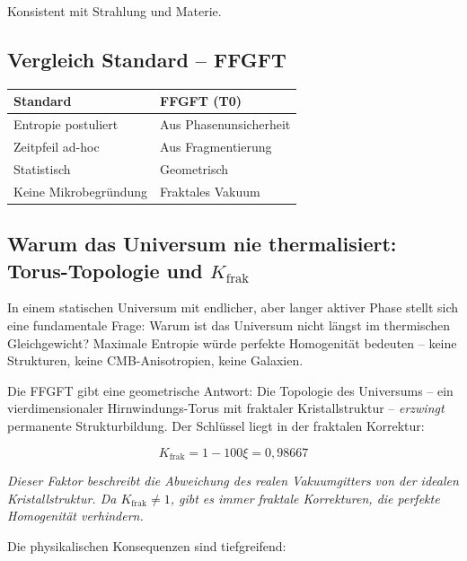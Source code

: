 	Konsistent mit Strahlung und Materie.
	
	\subsection*{Vergleich Standard – FFGFT}
	
	\begin{center}
		\begin{tabular}{p{}p{}}
			\textbf{Standard} & \textbf{FFGFT (T0)} \\
			\hline
			Entropie postuliert & Aus Phasenunsicherheit \\
			Zeitpfeil ad-hoc & Aus Fragmentierung \\
			Statistisch & Geometrisch \\
			Keine Mikrobegründung & Fraktales Vakuum \\
		\end{tabular}
	\end{center}
	
	\subsection*{Warum das Universum nie thermalisiert: Torus-Topologie und $K_{\text{frak}}$}
	
	In einem statischen Universum mit endlicher, aber langer aktiver Phase stellt sich eine fundamentale Frage: Warum ist das Universum nicht längst im thermischen Gleichgewicht? Maximale Entropie würde perfekte Homogenität bedeuten -- keine Strukturen, keine CMB-Anisotropien, keine Galaxien.
	
	Die FFGFT gibt eine geometrische Antwort: Die Topologie des Universums -- ein vierdimensionaler Hirnwindungs-Torus mit fraktaler Kristallstruktur -- \textit{erzwingt} permanente Strukturbildung. Der Schlüssel liegt in der fraktalen Korrektur:
	
	\begin{equation}
		K_{\text{frak}} = 1 - 100\xi = 0{,}98667
	\end{equation}
	
	\textit{Dieser Faktor beschreibt die Abweichung des realen Vakuumgitters von der idealen Kristallstruktur. Da $K_{\text{frak}} \neq 1$, gibt es \textit{immer} fraktale Korrekturen, die perfekte Homogenität verhindern.}
	
	Die physikalischen Konsequenzen sind tiefgreifend:
	
